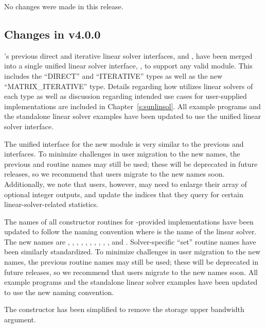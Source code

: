 No changes were made in this release.

\subsection*{Changes in v4.0.0}

{\cvode}'s previous direct and iterative linear solver interfaces,
{\cvdls} and {\cvspils}, have been merged into a single unified linear
solver interface, {\cvls}, to support any valid {\sunlinsol} module.
This includes the ``DIRECT'' and ``ITERATIVE'' types as well as the new
``MATRIX\_ITERATIVE'' type. Details regarding how {\cvls} utilizes linear
solvers of each type as well as discussion regarding intended use cases for
user-supplied {\sunlinsol} implementations are included in
Chapter~\ref{s:sunlinsol}. All {\cvode} example programs and the standalone
linear solver examples have been updated to use the unified linear solver
interface.

The unified interface for the new {\cvls} module is very similar to the
previous {\cvdls} and {\cvspils} interfaces. To minimize challenges in user
migration to the new names, the previous {\CC} and {\F} routine names may still
be used; these will be deprecated in future releases, so we recommend that users
migrate to the new names soon. Additionally, we note that {\F} users, however,
may need to enlarge their  array of optional integer outputs, and
update the indices that they query for certain linear-solver-related
statistics.

The names of all constructor routines for {\sundials}-provided
{\sunlinsol} implementations have been updated to follow the naming convention
 where \id{*} is the name of the linear solver. The new names
are
,
,
,
,\newline
{},
,
,
,
,
, and
.  Solver-specific ``set'' routine names have
been similarly standardized.  To minimize challenges in user migration
to the new names, the previous routine names may still be used; these
will be deprecated in future releases, so we recommend that users
migrate to the new names soon. All {\cvode} example programs and the standalone
linear solver examples have been updated to use the new naming convention.

The  constructor has been simplified to remove the
storage upper bandwidth argument.

